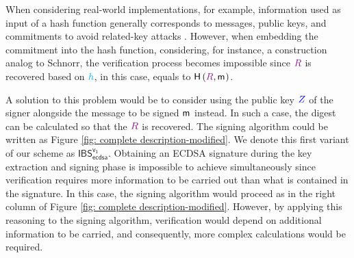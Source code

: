 \documentclass[version=submission, floatrow]{iacrcc}
\begin{document}
When considering real-world implementations, for example, information used as input of a hash function generally corresponds to messages, public keys, and commitments to avoid related-key attacks \cite{Bellare2003, Morita2015}. 
%
However, when embedding the commitment into the hash function, considering, for instance, a construction analog to Schnorr, the verification process becomes impossible since $\Commitment{R}$ is recovered based on $\textcolor{cyan}{h}$, in this case, equals to $\HashH{\Commitment{R}, \msg{}}$. 

A solution to this problem would be to consider using the public key $\textcolor{blue}{Z}$ of the signer alongside the message to be signed $\mathsf{m}_{}$ instead.
%
In such a case, the digest can be calculated so that the $\Commitment{R}$ is recovered.
%
The signing algorithm could be written as Figure \ref{fig: complete description-modified}. We denote this first variant of our scheme as $\mathsf{IBS}_{\mathsf{ecdsa}}^{\mathsf{v_{1}}}$.
%
Obtaining an ECDSA signature during the key extraction and signing phase is impossible to achieve simultaneously since verification requires more information to be carried out than what is contained in the signature. 
% 
In this case, the signing algorithm would proceed as in the right column of Figure \ref{fig: complete description-modified}. 
% 
However, by applying this reasoning to the signing algorithm, verification would depend on additional information to be carried, and consequently, more complex calculations would be required.
%
\end{document}
